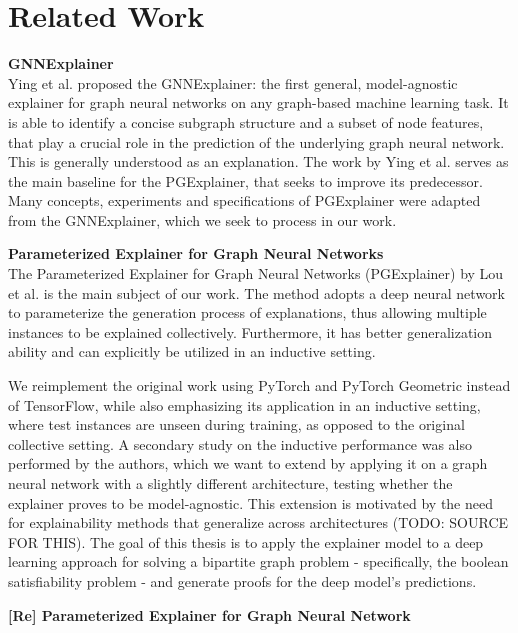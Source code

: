 \chapter{Related Work}

\textbf{GNNExplainer} \\
Ying et al. proposed the GNNExplainer\cite{ying2019gnnexplainer}: the first general, model-agnostic explainer for graph neural networks on any graph-based machine learning task. It is able to identify a concise subgraph structure and a subset of node features, that play a crucial role in the prediction of the underlying graph neural network. This is generally understood as an explanation. The work by Ying et al. serves as the main baseline for the PGExplainer, that seeks to improve its predecessor. Many concepts, experiments and specifications of PGExplainer were adapted from the GNNExplainer, which we seek to process in our work. \bigskip

\textbf{Parameterized Explainer for Graph Neural Networks} \\
The Parameterized Explainer for Graph Neural Networks (PGExplainer) by Lou et al.\cite{luo2020parameterized} is the main subject of our work. The method adopts a deep neural network to parameterize the generation process of explanations, thus allowing multiple instances to be explained collectively. Furthermore, it has better generalization ability and can explicitly be utilized in an inductive setting.

We reimplement the original work using PyTorch\cite{paszke2019pytorch} and PyTorch Geometric\cite{Fey/Lenssen/2019} instead of TensorFlow\cite{tensorflow2015-whitepaper}, while also emphasizing its application in an inductive setting, where test instances are unseen during training, as opposed to the original collective setting. A secondary study on the inductive performance was also performed by the authors, which we want to extend by applying it on a graph neural network with a slightly different architecture, testing whether the explainer proves to be model-agnostic. This extension is motivated by the need for explainability methods that generalize across architectures (TODO: SOURCE FOR THIS). The goal of this thesis is to apply the explainer model to a deep learning approach for solving a bipartite graph problem - specifically, the boolean satisfiability problem - and generate proofs for the deep model's predictions. \bigskip

\textbf{[Re] Parameterized Explainer for Graph Neural Network} \\

